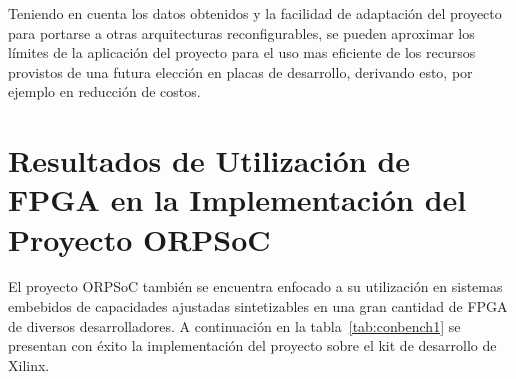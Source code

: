 Teniendo en cuenta los datos obtenidos y la facilidad de adaptación del proyecto para portarse a otras arquitecturas reconfigurables, se pueden aproximar los límites de la aplicación del proyecto para el uso mas eficiente de los recursos provistos de una futura elección en placas de desarrollo, derivando esto, por ejemplo en reducción de costos.


\newpage
	\section{Resultados de Utilización de FPGA en la Implementación del Proyecto ORPSoC}

El proyecto ORPSoC también se encuentra enfocado a su utilización en sistemas embebidos de capacidades ajustadas sintetizables en una gran cantidad de FPGA de diversos desarrolladores. A continuación en la tabla~\ref{tab:conbench1} se presentan con éxito la  implementación del proyecto sobre el kit de desarrollo de Xilinx.
		
